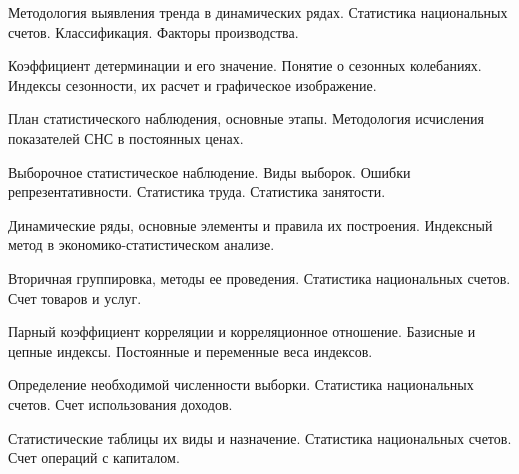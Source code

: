 \z Методология выявления тренда в динамических рядах.
 \medskip
\z Статистика национальных счетов. Классификация. Факторы производства.
 \medskip

\newpage


\shapkFull
\setcounter{zad}{0}

\z Коэффициент детерминации и его значение.
 \medskip
\z Понятие о сезонных колебаниях. Индексы сезонности, их расчет и графическое изображение.
 \medskip

\newpage


\shapkFull
\setcounter{zad}{0}

\z План статистического наблюдения, основные этапы.
 \medskip
\z Методология исчисления показателей СНС в постоянных ценах.
 \medskip

\newpage


\shapkFull
\setcounter{zad}{0}

\z Выборочное статистическое наблюдение. Виды выборок. Ошибки репрезентативности.
 \medskip
\z Статистика труда. Статистика занятости.
 \medskip

\newpage


\shapkFull
\setcounter{zad}{0}

\z Динамические ряды, основные элементы и правила их построения.
 \medskip
\z Индексный метод в экономико-статистическом анализе.
 \medskip

\newpage


\shapkFull
\setcounter{zad}{0}

\z Вторичная группировка, методы ее проведения.
 \medskip
\z Статистика национальных счетов. Счет товаров и услуг.
 \medskip

\newpage


\shapkFull
\setcounter{zad}{0}

\z Парный коэффициент корреляции и корреляционное отношение.
 \medskip
\z Базисные и цепные индексы. Постоянные и переменные веса индексов.
 \medskip

\newpage


\shapkFull
\setcounter{zad}{0}

\z Определение необходимой численности выборки.
 \medskip
\z Статистика национальных счетов. Счет использования доходов.
 \medskip

\newpage


\shapkFull
\setcounter{zad}{0}

\z Статистические таблицы их виды и назначение.
 \medskip
\z Статистика национальных счетов. Счет операций с капиталом.
 \medskip

\newpage